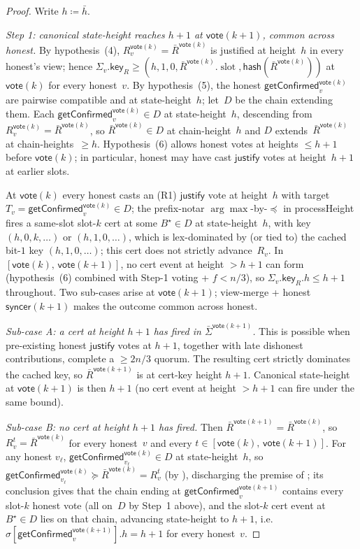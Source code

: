 \ifx\litemode\undefined\documentclass{article}\fi
\newcommand{\slot}[0]{\ensuremath{\operatorname{\mathrm{slot}}}}
\newcommand{\just}{\ensuremath{\mathsf{justify}}\xspace}
\newcommand{\hash}{\mathsf{hash}}
\newcommand{\key}{\mathsf{key}}
\newcommand{\syncer}{\mathsf{syncer}}
\newcommand{\vote}{\mathsf{vote}}
\newcommand{\comm}[1]{\bar{#1}}
\newcommand{\processHeight}{\textsf{processHeight}\xspace}
\newcommand{\getConfirmed}{\textsf{getConfirmed}\xspace}
\theoremstyle{plain}
\theoremstyle{definition}
\theoremstyle{remark}
\begin{document}
\begin{proof}
Write $h \coloneqq \comm{h}$.

\emph{Step 1: canonical state-height reaches $h+1$ at $\vote(k+1)$, common across honest.}
By hypothesis~(4), $R_v^{\vote(k)} = \comm{R}^{\vote(k)}$ is justified at height~$h$ in every honest's view; hence $\Sigma_v.\key_R \geq (h, 1, 0, \comm{R}^{\vote(k)}.\slot, \hash(\comm{R}^{\vote(k)}))$ at $\vote(k)$ for every honest~$v$. By hypothesis~(5), the honest $\getConfirmed_v^{\vote(k)}$ are pairwise compatible and at state-height~$h$; let~$D$ be the chain extending them. Each $\getConfirmed_v^{\vote(k)} \in D$ at state-height~$h$, descending from $R_v^{\vote(k)} = \comm{R}^{\vote(k)}$, so $\comm{R}^{\vote(k)} \in D$ at chain-height~$h$ and $D$ extends~$\comm{R}^{\vote(k)}$ at chain-heights~$\geq h$. Hypothesis~(6) allows honest votes at heights $\leq h+1$ before $\vote(k)$; in particular, honest may have cast \just votes at height~$h+1$ at earlier slots.

At $\vote(k)$ every honest casts an (R1) \just vote at height~$h$ with target $T_v = \getConfirmed_v^{\vote(k)} \in D$; the prefix-notar $\arg\max$-by-$\preceq$ in \processHeight{} fires a same-slot slot-$k$ cert at some $B^\star \in D$ at state-height~$h$, with key $(h, 0, k, \ldots)$ or $(h, 1, 0, \ldots)$, which is lex-dominated by (or tied to) the cached bit-$1$ key $(h, 1, 0, \ldots)$; this cert does not strictly advance~$R_v$. In $[\vote(k),\, \vote(k+1)]$, no cert event at height $>h+1$ can form (hypothesis~(6) combined with Step-1 voting + $f<n/3$), so $\Sigma_v.\key_R.h \leq h+1$ throughout. Two sub-cases arise at $\vote(k+1)$; view-merge + honest $\syncer(k+1)$ makes the outcome common across honest.

\emph{Sub-case A: a cert at height $h+1$ has fired in $\comm{\Sigma}^{\vote(k+1)}$.}
This is possible when pre-existing honest \just votes at $h+1$, together with late dishonest contributions, complete a $\geq 2n/3$ quorum. The resulting cert strictly dominates the cached key, so $\comm{R}^{\vote(k+1)}$ is at cert-key height $h+1$. Canonical state-height at $\vote(k+1)$ is then $h+1$ (no cert event at height $>h+1$ can fire under the same bound).

\emph{Sub-case B: no cert at height $h+1$ has fired.}
Then $\comm{R}^{\vote(k+1)} = \comm{R}^{\vote(k)}$, so $R_v^t = \comm{R}^{\vote(k)}$ for every honest~$v$ and every $t \in [\vote(k),\, \vote(k+1)]$. For any honest $v_\ell$, $\getConfirmed_{v_\ell}^{\vote(k)} \in D$ at state-height~$h$, so $\getConfirmed_{v_\ell}^{\vote(k)} \succeq \comm{R}^{\vote(k)} = R_v^t$ (by ), discharging the premise of ; its conclusion gives that the chain ending at $\getConfirmed_v^{\vote(k+1)}$ contains every slot-$k$ honest vote (all on~$D$ by Step~1 above), and the slot-$k$ cert event at $B^\star \in D$ lies on that chain, advancing state-height to $h+1$, i.e.\ $\sigma[\getConfirmed_v^{\vote(k+1)}].h = h + 1$ for every honest~$v$.


\end{proof}
\end{document}
